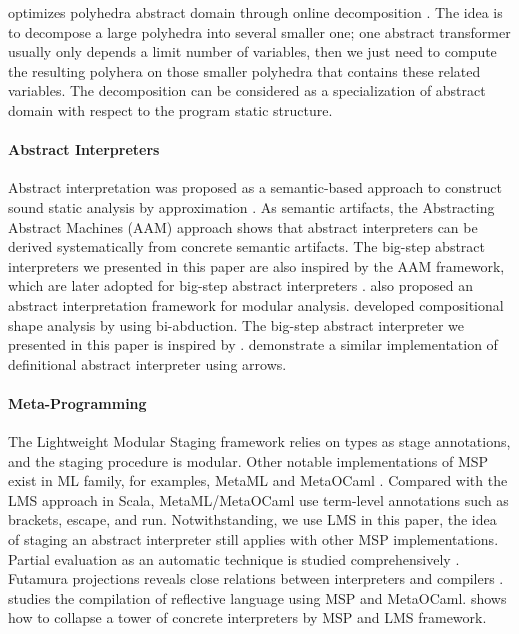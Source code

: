 \citeauthor{DBLP:conf/popl/SinghPV17} optimizes polyhedra abstract domain through online decomposition \cite{DBLP:conf/popl/SinghPV17, Singh:2017:PCD:3177123.3158143}.
The idea is to decompose a large polyhedra into several smaller one; one abstract transformer
usually only depends a limit number of variables, then we just need to compute the resulting polyhera
on those smaller polyhedra that contains these related variables.
The decomposition can be considered as a specialization of abstract domain with respect to the program
static structure.

\paragraph{Abstract Interpreters}
Abstract interpretation was proposed as a semantic-based approach to construct sound static analysis by approximation \cite{DBLP:conf/popl/CousotC77}.
As semantic artifacts, the Abstracting Abstract Machines (AAM) \cite{DBLP:journals/jfp/HornM12, DBLP:conf/icfp/HornM10}
approach shows that abstract interpreters can be derived systematically from concrete semantic artifacts.
The big-step abstract interpreters we presented in this paper are also inspired by the AAM framework,
which are later adopted for big-step abstract interpreters \cite{DBLP:journals/pacmpl/DaraisLNH17, Wei:2018:RAA:3243631.3236800}.
\citet{DBLP:conf/cc/CousotC02} also proposed an abstract interpretation framework for modular analysis.
\citet{DBLP:conf/popl/CalcagnoDOY09} developed compositional shape analysis by using bi-abduction.
The big-step abstract interpreter we presented in this paper is inspired by \cite{DBLP:journals/pacmpl/DaraisLNH17, Wei:2018:RAA:3243631.3236800}. 
\citet{Keidel:2018:CSP:3243631.3236767} demonstrate a similar implementation of definitional abstract interpreter using arrows.

\paragraph{Meta-Programming}
The Lightweight Modular Staging framework relies on types as stage annotations, and the staging
procedure is modular.
Other notable implementations of MSP exist in ML family, for examples, MetaML \cite{DBLP:conf/pepm/TahaS97} 
and MetaOCaml \cite{DBLP:conf/gpce/CalcagnoTHL03, DBLP:conf/flops/Kiselyov14}.
Compared with the LMS approach in Scala, MetaML/MetaOCaml use term-level annotations such as brackets, 
escape, and run. Notwithstanding, we use LMS in this paper, the idea of staging an abstract interpreter
still applies with other MSP implementations.
Partial evaluation as an automatic technique is studied comprehensively
\cite{10.1007/3-540-61580-6_11, DBLP:books/daglib/0072559}.
Futamura projections reveals close relations between interpreters and compilers \cite{Futamura1999, futamura1971partial}.
\citet{DBLP:conf/gpce/Asai14} studies the compilation of reflective language using MSP and MetaOCaml.
\citeauthor{Amin:2017:CTI:3177123.3158140} shows how to collapse a tower of concrete interpreters by MSP and LMS framework.
